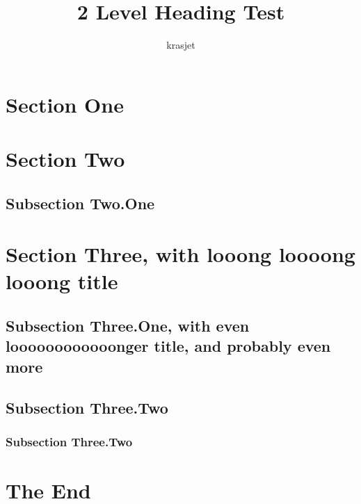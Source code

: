 \documentclass{article}
\title{2 Level Heading Test}
\author{krasjet}
\date{}
\begin{document}
\maketitle

\section{Section One}

\lipsum[2-4]

\section{Section Two}

\lipsum[2-5]

\subsection{Subsection Two.One}
\lipsum[2-5]

\section{Section Three, with looong loooong looong title}

\lipsum[1-2]

\subsection{Subsection Three.One, with even loooooooooooonger title, and probably even more}
\lipsum[2-5]

\subsection{Subsection Three.Two}
\lipsum[1-1]

\subsubsection{Subsection Three.Two}
\lipsum[2-3]

\section{The End}

\lipsum[2-5]
\end{document}
